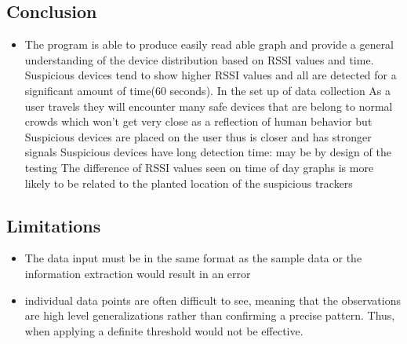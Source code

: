 \documentclass{article}
\begin{document}
\begin{multicols}{2}

\section{Conclusion}
\begin{itemize}
\item The program is able to produce easily read able graph and provide a general understanding of the device distribution based on RSSI values and time. Suspicious devices tend to show higher RSSI values and all are detected for a significant amount of time(60 seconds). In the set up of data collection As a user travels they will encounter many safe devices that are belong to normal crowds which won’t get very close as a reflection of human behavior but Suspicious devices are placed on the user thus is closer and has stronger signals
Suspicious devices have long detection time: may be by design of the testing
The difference of RSSI values seen on time of day graphs is more likely to be related to the planted location of the suspicious trackers
\end{itemize}
\subsection{Limitations}

\begin{itemize}
\item The data input must be in the same format as the sample data or the information extraction would result in an error
\item individual data points are often difficult to see, meaning that the observations are high level generalizations rather than confirming a precise pattern. Thus, when applying a definite threshold would not be effective.
\end{itemize}
\end{multicols}

\newpage





\end{document}
